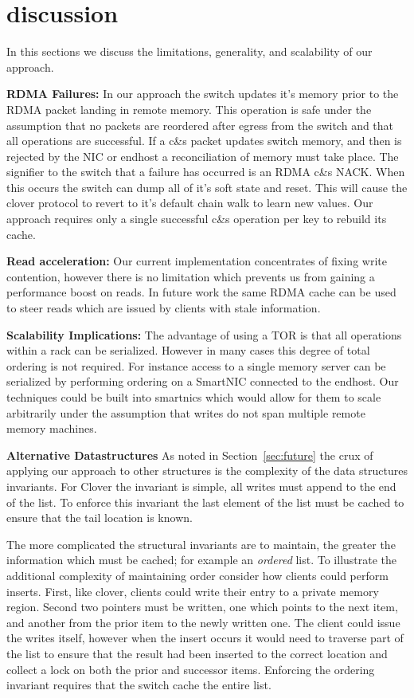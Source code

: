 \section{discussion}

In this sections we discuss the limitations, generality, and scalability of our approach.



\textbf{RDMA Failures:}
In our approach the switch updates it's memory prior to the RDMA packet
landing in remote memory. This operation is safe under the assumption that no
packets are reordered after egress from the switch and that all operations
are successful. If a c\&s packet updates switch memory, and then is rejected
by the NIC or endhost a reconciliation of memory must take place. The
signifier to the switch that a failure has occurred is an RDMA c\&s NACK. When
this occurs the switch can dump all of it's soft state and reset. This will
cause the clover protocol to revert to it's default chain walk to learn new
values. Our approach requires only a single successful c\&s operation per key
to rebuild its cache.

\textbf{Read acceleration:}
Our current implementation concentrates of fixing write contention,
however there is no limitation which prevents us from gaining a performance
boost on reads. In future work the same RDMA cache can be used to steer
reads which are issued by clients with stale information.


\textbf{Scalability Implications:}
The advantage of using a TOR is that all operations within a rack can be
serialized. However in many cases this degree of total ordering is not
required. For instance access to a single memory server can be serialized by
performing ordering on a SmartNIC connected to the endhost. Our techniques
could be built into smartnics which would allow for them to scale arbitrarily
under the assumption that writes do not span multiple remote memory machines.


\textbf{Alternative Datastructures}
As noted in Section~\ref{sec:future} the crux of applying our approach to other
structures is the complexity of the data structures invariants. For Clover
the invariant is simple, all writes must append to the end of the list. To
enforce this invariant the last element of the list must be cached to ensure
that the tail location is known.

The more complicated the structural invariants are to maintain, the greater
the information which must be cached; for example an \textit{ordered} list.
To illustrate the additional complexity of maintaining order consider how
clients could perform inserts. First, like clover, clients could write their
entry to a private memory region. Second two pointers must be written, one
which points to the next item, and another from the prior item to the newly
written one. The client could issue the writes itself, however when the
insert occurs it would need to traverse part of the list to ensure that the
result had been inserted to the correct location and collect a lock on both
the prior and successor items. Enforcing the ordering invariant requires that
the switch cache the entire list.

